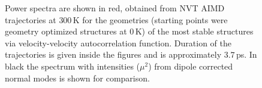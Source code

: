 \documentclass[11pt,DIV=13,BCOR=5mm,a4paper,headinclude]{scrbook}
\begin{document}
\begin{figure}[!h]
    \centering
             \quad
             \quad
             \caption{Power spectra are shown in red, obtained from NVT AIMD trajectories at $300\,$K for the geometries (starting points were geometry optimized structures at $0\,$K) of the most stable structures via velocity-velocity autocorrelation function.
Duration of the trajectories is given inside the figures and is approximately $3.7\,$ps.
In black the spectrum with intensities ($\mu^2$) from dipole corrected normal modes is shown for comparison.}
            \label{abb:velvel_ads_spec}
\end{figure}
\end{document}
